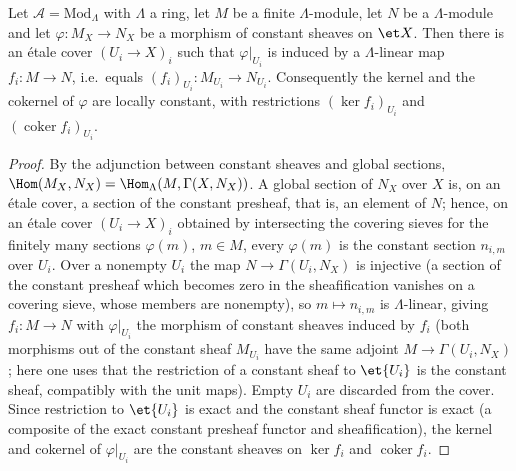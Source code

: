 \begin{lemma}
\label{lemma:constructible-hom-constant-locally}
\leanok
Let $\mathcal A=\mathrm{Mod}_\Lambda$ with $\Lambda$ a ring, let $M$ be a finite
$\Lambda$-module, let $N$ be a $\Lambda$-module and let $\varphi\colon M_X\to N_X$ be a
morphism of constant sheaves on $\et X$.  Then there is an \'etale cover
$(U_i\to X)_i$ such that $\varphi|_{U_i}$ is induced by a $\Lambda$-linear
map $f_i\colon M\to N$, i.e.\ equals $(f_i)_{U_i}\colon M_{U_i}\to N_{U_i}$.
Consequently the kernel and the cokernel of $\varphi$ are locally constant,
with restrictions $(\ker f_i)_{U_i}$ and $(\operatorname{coker}f_i)_{U_i}$.
\end{lemma}
\begin{proof}
\leanok
By the adjunction between constant sheaves and global sections,
$\Hom(M_X,N_X)=\Hom_\Lambda(M,\Gamma(X,N_X))$.  A global section of $N_X$
over $X$ is, on an \'etale cover, a section of the constant presheaf, that
is, an element of $N$; hence, on an \'etale cover $(U_i\to X)_i$ obtained by
intersecting the covering sieves for the finitely many sections $\varphi(m)$,
$m\in M$, every $\varphi(m)$ is the constant section $n_{i,m}$ over $U_i$.
Over a nonempty $U_i$ the map $N\to\Gamma(U_i,N_X)$ is injective (a
section of the constant presheaf which becomes zero in the sheafification
vanishes on a covering sieve, whose members are nonempty), so
$m\mapsto n_{i,m}$ is $\Lambda$-linear, giving $f_i\colon M\to N$ with
$\varphi|_{U_i}$ the morphism of constant sheaves induced by $f_i$ (both
morphisms out of the constant sheaf $M_{U_i}$ have the same adjoint
$M\to\Gamma(U_i,N_X)$; here one uses that the restriction of a constant
sheaf to $\et{U_i}$ is the constant sheaf, compatibly with the unit maps).
Empty $U_i$ are discarded from the cover.
Since restriction to $\et{U_i}$ is exact and the constant sheaf functor is
exact (a composite of the exact constant presheaf functor and
sheafification), the kernel and cokernel of $\varphi|_{U_i}$ are the
constant sheaves on $\ker f_i$ and $\operatorname{coker}f_i$.
\end{proof}

